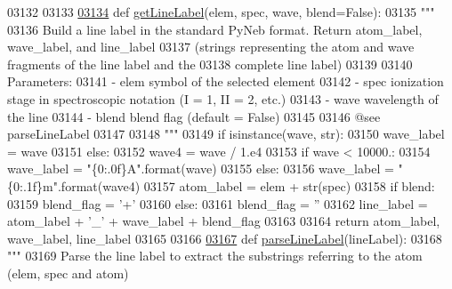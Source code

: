 \begin{DoxyCode}
{{{{{{{{{{{{{{{{{{{{{{03132 
03133 
\hypertarget{pynebcore_8py_source_l03134}{}\hyperlink{namespacepyneb_1_1core_1_1pynebcore_a14c882fc308d727f77ed33c1f56212e4}{03134} \textcolor{keyword}{def }\hyperlink{namespacepyneb_1_1core_1_1pynebcore_a14c882fc308d727f77ed33c1f56212e4}{getLineLabel}(elem, spec, wave, blend=False):
03135     \textcolor{stringliteral}{"""}
03136 \textcolor{stringliteral}{    Build a line label in the standard PyNeb format. Return atom\_label, wave\_label, and line\_label }
03137 \textcolor{stringliteral}{            (strings representing the atom and wave fragments of the line label and the }
03138 \textcolor{stringliteral}{                complete line label)}
03139 \textcolor{stringliteral}{    }
03140 \textcolor{stringliteral}{    Parameters:}
03141 \textcolor{stringliteral}{        - elem      symbol of the selected element}
03142 \textcolor{stringliteral}{        - spec      ionization stage in spectroscopic notation (I = 1, II = 2, etc.)}
03143 \textcolor{stringliteral}{        - wave      wavelength of the line}
03144 \textcolor{stringliteral}{        - blend     blend flag (default = False)}
03145 \textcolor{stringliteral}{}
03146 \textcolor{stringliteral}{    @see parseLineLabel}
03147 \textcolor{stringliteral}{    }
03148 \textcolor{stringliteral}{    """}    
03149     \textcolor{keywordflow}{if} isinstance(wave, str):
03150         wave\_label = wave
03151     \textcolor{keywordflow}{else}:
03152         wave4 = wave / 1.e4
03153         \textcolor{keywordflow}{if} wave < 10000.:
03154             wave\_label = \textcolor{stringliteral}{"\{0:.0f\}A"}.format(wave)
03155         \textcolor{keywordflow}{else}:
03156             wave\_label = \textcolor{stringliteral}{"\{0:.1f\}m"}.format(wave4)
03157     atom\_label = elem + str(spec)
03158     \textcolor{keywordflow}{if} blend:
03159         blend\_flag = \textcolor{stringliteral}{'+'}
03160     \textcolor{keywordflow}{else}:
03161         blend\_flag = \textcolor{stringliteral}{''}
03162     line\_label = atom\_label + \textcolor{stringliteral}{'\_'} + wave\_label + blend\_flag
03163 
03164     \textcolor{keywordflow}{return} atom\_label, wave\_label, line\_label
03165 
03166 
\hypertarget{pynebcore_8py_source_l03167}{}\hyperlink{namespacepyneb_1_1core_1_1pynebcore_a9fa8b0b7efdd4da21a816641bf17dcc7}{03167} \textcolor{keyword}{def }\hyperlink{namespacepyneb_1_1core_1_1pynebcore_a9fa8b0b7efdd4da21a816641bf17dcc7}{parseLineLabel}(lineLabel):
03168     \textcolor{stringliteral}{"""}
03169 \textcolor{stringliteral}{    Parse the line label to extract the substrings referring to the atom (elem, spec and atom)}
}}}}}}}}}}}}}}}}}}}}}}
\end{DoxyCode}
